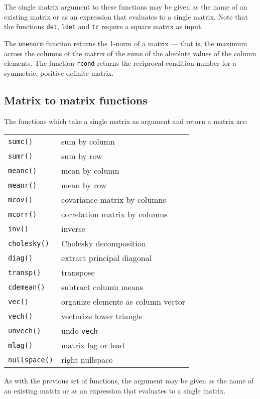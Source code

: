 The single matrix argument to these functions may be given as the name
of an existing matrix or as an expression that evaluates to a single
matrix.  Note that the functions \texttt{det}, \texttt{ldet} and
\texttt{tr} require a square matrix as input.  

The \texttt{onenorm} function returns the 1-norm of a matrix --- that
is, the maximum across the columns of the matrix of the sums of the
absolute values of the column elements.  The function \texttt{rcond}
returns the reciprocal condition number for a symmetric, positive
definite matrix.

\subsection{Matrix to matrix functions}
\label{matrix-to-matrix}

The functions which take a single matrix as argument and return a
matrix are:

\begin{center}
\begin{tabular}{ll}
\texttt{sumc()} & sum by column \\
\texttt{sumr()} & sum by row \\
\texttt{meanc()} & mean by column \\
\texttt{meanr()} & mean by row \\
\texttt{mcov()} & covariance matrix by columns \\
\texttt{mcorr()} & correlation matrix by columns \\
\texttt{inv()} & inverse \\
\texttt{cholesky()} & Cholesky decomposition \\
\texttt{diag()} & extract principal diagonal \\
\texttt{transp()} & transpose \\
\texttt{cdemean()} & subtract column means \\ 
\texttt{vec()} & organize elements as column vector \\
\texttt{vech()} & vectorize lower triangle \\
\texttt{unvech()} & undo \texttt{vech} \\
\texttt{mlag()} & matrix lag or lead \\
\texttt{nullspace()} & right nullspace
\end{tabular}
\end{center}

As with the previous set of functions, the argument may be given as
the name of an existing matrix or as an expression that evaluates to a
single matrix.

